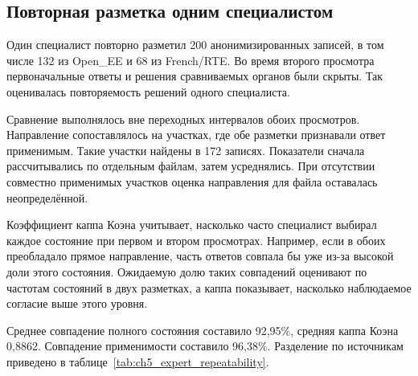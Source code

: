 {}

\subsection{Повторная разметка одним специалистом}

Один специалист повторно разметил 200 анонимизированных записей, в том числе 132 из
Open\_EE и 68 из French/RTE. Во время второго просмотра первоначальные ответы и решения
сравниваемых органов были скрыты. Так оценивалась повторяемость решений одного
специалиста.

Сравнение выполнялось вне переходных интервалов обоих просмотров. Направление
сопоставлялось на участках, где обе разметки признавали ответ применимым. Такие участки
найдены в 172 записях. Показатели сначала рассчитывались по отдельным файлам, затем
усреднялись. При отсутствии совместно применимых участков оценка направления для файла
оставалась неопределённой.

Коэффициент каппа Коэна учитывает, насколько часто специалист выбирал каждое состояние
при первом и втором просмотрах. Например, если в обоих преобладало прямое направление,
часть ответов совпала бы уже из-за высокой доли этого состояния. Ожидаемую долю таких
совпадений оценивают по частотам состояний в двух разметках, а каппа показывает,
насколько наблюдаемое согласие выше этого уровня.

{}

Среднее совпадение полного состояния
составило 92,95\%, средняя каппа Коэна 0,8862.
Совпадение применимости составило 96,38\%.
Разделение по источникам приведено
в таблице~\ref{tab:ch5_expert_repeatability}.

